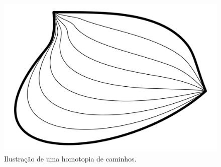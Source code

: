 \begin{figure}[!ht]
\centering
\includegraphics[scale=0.15]{imagens/homotopy.png}

\caption{Ilustração de uma homotopia de caminhos.}
\end{figure}

